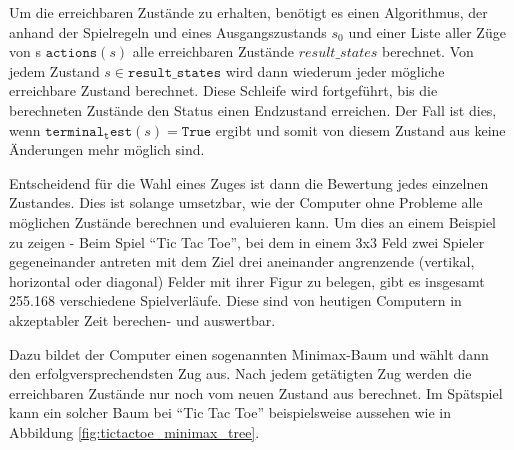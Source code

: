 Um die erreichbaren Zustände zu erhalten, benötigt es einen Algorithmus, der anhand der Spielregeln und eines Ausgangszustands $s_0$ und einer Liste aller Züge von s $\mathtt{actions}(s)$ alle erreichbaren Zustände $result\_states$ berechnet. Von jedem Zustand $s \in \mathtt{result\_states}$ wird dann wiederum jeder mögliche erreichbare Zustand berechnet. Diese Schleife wird fortgeführt, bis die berechneten Zustände den Status einen Endzustand erreichen. Der Fall ist dies, wenn $\mathtt{terminal_test}(s) = \mathtt{True}$ ergibt und somit von diesem Zustand aus keine Änderungen mehr möglich sind.

Entscheidend für die Wahl eines Zuges ist dann die Bewertung jedes einzelnen Zustandes. Dies ist solange umsetzbar, wie der Computer ohne Probleme alle möglichen Zustände berechnen und evaluieren kann. Um dies an einem Beispiel zu zeigen - Beim Spiel ``Tic Tac Toe'', bei dem in einem 3x3 Feld zwei Spieler gegeneinander antreten mit dem Ziel drei aneinander angrenzende (vertikal, horizontal oder diagonal) Felder mit ihrer Figur zu belegen, gibt es insgesamt 255.168 verschiedene Spielverläufe. \cite{Kaplan2017} Diese sind von heutigen Computern in akzeptabler Zeit berechen- und auswertbar.


Dazu bildet der Computer einen sogenannten Minimax-Baum und wählt dann den erfolgversprechendsten Zug aus. Nach jedem getätigten Zug werden die erreichbaren Zustände nur noch vom neuen Zustand aus berechnet. Im Spätspiel kann ein solcher Baum bei ``Tic Tac Toe'' beispielsweise aussehen wie in Abbildung \ref{fig:tictactoe_minimax_tree}.

